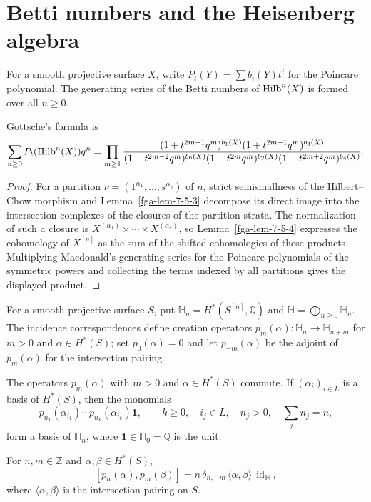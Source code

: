 \section{Betti numbers and the Heisenberg algebra}
\begin{definition}\label{fga-def-7-5-1}\uses{}
For a smooth projective surface $X$, write $P_t(Y)=\sum b_i(Y)t^i$ for the
Poincare polynomial.  The generating series of the Betti numbers of
$\operatorname{Hilb}^n(X)$ is formed over all $n\ge0$.
\end{definition}\begin{theorem}\label{fga-thm-7-5-5}
Gottsche's formula is
\[
\sum_{n\ge0}P_t(\operatorname{Hilb}^n(X))q^n=
\prod_{m\ge1}
\frac{(1+t^{2m-1}q^m)^{b_1(X)}(1+t^{2m+1}q^m)^{b_3(X)}}
{(1-t^{2m-2}q^m)^{b_0(X)}(1-t^{2m}q^m)^{b_2(X)}
 (1-t^{2m+2}q^m)^{b_4(X)}}.
\]
\end{theorem}
\begin{proof}
For a partition $\nu=(1^{\alpha_1},\ldots,s^{\alpha_s})$ of $n$, strict
semismallness of the Hilbert--Chow morphism and
Lemma~\ref{fga-lem-7-5-3} decompose its direct image into the intersection
complexes of the closures of the partition strata.  The normalization of such
a closure is $X^{(\alpha_1)}\times\cdots\times X^{(\alpha_s)}$, so
Lemma~\ref{fga-lem-7-5-4} expresses the cohomology of $X^{[n]}$ as the sum of
the shifted cohomologies of these products.  Multiplying Macdonald's generating
series for the Poincare polynomials of the symmetric powers and collecting the
terms indexed by all partitions gives the displayed product.
\end{proof}
For a smooth projective surface $S$, put
$\mathbb H_n=H^*(S^{[n]},\mathbb Q)$ and
$\mathbb H=\bigoplus_{n\ge0}\mathbb H_n$.  The incidence correspondences
define creation operators
$p_m(\alpha):\mathbb H_n\to\mathbb H_{n+m}$ for $m>0$ and
$\alpha\in H^*(S)$; set $p_0(\alpha)=0$ and let
$p_{-m}(\alpha)$ be the adjoint of $p_m(\alpha)$ for the intersection pairing.

\begin{theorem}\label{fga-thm-7-6-1}
The operators $p_m(\alpha)$ with $m>0$ and $\alpha\in H^*(S)$ commute.  If
$(\alpha_i)_{i\in L}$ is a basis of $H^*(S)$, then the monomials
\[
p_{n_1}(\alpha_{i_1})\cdots p_{n_k}(\alpha_{i_k})\mathbf 1,
\qquad k\ge0,\quad i_j\in L,\quad n_j>0,\quad\sum_jn_j=n,
\]
form a basis of $\mathbb H_n$, where $\mathbf1\in\mathbb H_0=\mathbb Q$ is the
unit.
\end{theorem}

\begin{theorem}\label{fga-thm-7-6-2}
For $n,m\in\mathbb Z$ and $\alpha,\beta\in H^*(S)$,
\[
[p_n(\alpha),p_m(\beta)]
=n\,\delta_{n,-m}\,\langle\alpha,\beta\rangle\,\operatorname{id}_{\mathbb H},
\]
where $\langle\alpha,\beta\rangle$ is the intersection pairing on $S$.
\end{theorem}
